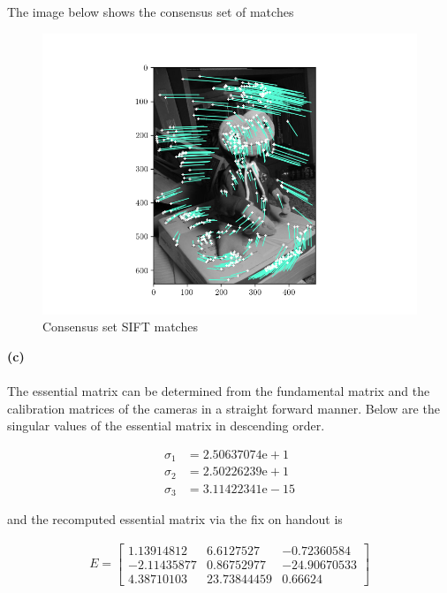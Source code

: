 \begin{homeworkProblem}
  \pagebreak

  The image below shows the consensus set of matches

  \begin{figure}[H]
    \centering
    \includegraphics[width=0.8\linewidth]{images/consesus_set.png}
    \caption{Consensus set SIFT matches}
  \end{figure}

  \textbf{(c)}
  \\
  \\

  The essential matrix can be determined from the fundamental matrix and the
  calibration matrices of the cameras in a straight forward manner. Below are
  the singular values of the essential matrix in descending order.

  \begin{align*}
    \sigma_1 &= 2.50637074\mathrm{e+}1 \\
    \sigma_2 &= 2.50226239\mathrm{e+}1 \\
    \sigma_3 &= 3.11422341\mathrm{e-}15
    \label{eq:singular_values}
  \end{align*}

  and the recomputed essential matrix via the fix on handout is

  \begin{align*}
    E = \begin{bmatrix}
              1.13914812 &  6.6127527 & -0.72360584 \\
              -2.11435877 &   0.86752977 & -24.90670533 \\
              4.38710103 & 23.73844459 &   0.66624
        \end{bmatrix}
  \end{align*}


\end{homeworkProblem}

